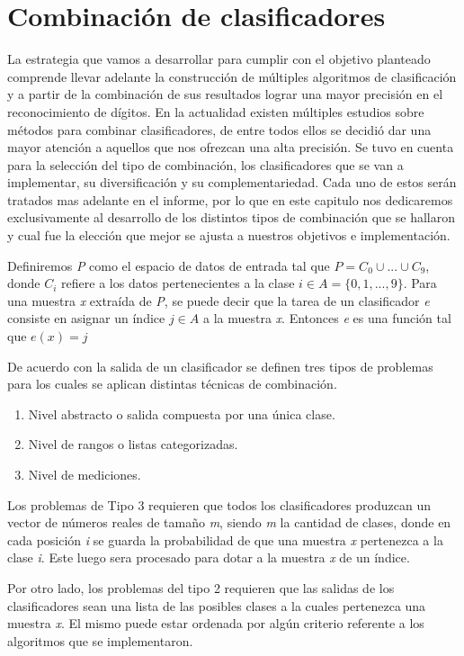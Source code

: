 \chapter{Combinación de clasificadores}
La estrategia que vamos a desarrollar para cumplir con el objetivo planteado comprende llevar adelante la construcción de múltiples algoritmos de clasificación y a partir de la combinación de sus resultados lograr una mayor precisión en el reconocimiento de dígitos. En la actualidad existen múltiples estudios sobre métodos para combinar clasificadores, de entre todos ellos se decidió dar una mayor atención a aquellos que nos ofrezcan una alta precisión. Se tuvo en cuenta para la selección del tipo de combinación, los clasificadores que se van a implementar, su diversificación y su complementariedad. Cada uno de estos serán tratados mas adelante en el informe, por lo que en este capitulo nos dedicaremos exclusivamente al desarrollo de los distintos tipos de combinación que se hallaron y cual fue la elección que mejor se ajusta a nuestros objetivos e implementación.

Definiremos \textit{P} como el espacio de datos de entrada tal que $ P = C_{0}\cup...\cup C_{9} $, donde $ C_{i} $ refiere a los datos pertenecientes a la clase $ \textit{i} \in A = \{0,1,...,9\} $. Para una muestra \textit{x} extraída de \textit{P}, se puede decir que la tarea de un clasificador \textit{e} consiste en asignar un índice $ \textit{j}\in A $ a la muestra \textit{x}. Entonces \textit{e} es una función tal que $ e(x) = j  $

De acuerdo con la salida de un clasificador se definen tres tipos de problemas para los cuales se aplican distintas técnicas de combinación.
\begin{enumerate}
  \item Nivel abstracto o salida compuesta por una única clase.
  \item Nivel de rangos o listas categorizadas.
  \item Nivel de mediciones.
\end{enumerate}
Los problemas de Tipo 3 requieren que todos los clasificadores produzcan un vector de números reales de tamaño \textit{m}, siendo \textit{m} la cantidad de clases, donde en cada posición \textit{i} se guarda la probabilidad de que una muestra \textit{x} pertenezca a la clase \textit{i}. Este luego sera procesado para dotar a la muestra \textit{x} de un índice.

Por otro lado, los problemas del tipo 2 requieren que las salidas de los clasificadores sean una lista de las posibles clases a la cuales pertenezca una muestra \textit{x}. El mismo puede estar ordenada por algún criterio referente a los algoritmos que se implementaron.

